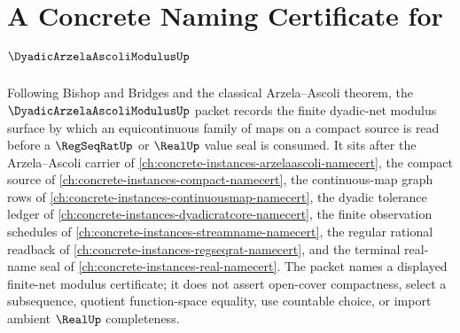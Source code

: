 \chapter{A Concrete Naming Certificate for $\DyadicArzelaAscoliModulusUp$}
\label{ch:concrete-instances-dyadic-arzela-ascoli-modulus-namecert}

Following Bishop and Bridges and the classical Arzela--Ascoli theorem, the $\DyadicArzelaAscoliModulusUp$ packet records the finite dyadic-net modulus surface by which an equicontinuous family of maps on a compact source is read before a $\RegSeqRatUp$ or $\RealUp$ value seal is consumed. It sits after the Arzela--Ascoli carrier of \autoref{ch:concrete-instances-arzelaascoli-namecert}, the compact source of \autoref{ch:concrete-instances-compact-namecert}, the continuous-map graph rows of \autoref{ch:concrete-instances-continuousmap-namecert}, the dyadic tolerance ledger of \autoref{ch:concrete-instances-dyadicratcore-namecert}, the finite observation schedules of \autoref{ch:concrete-instances-streamname-namecert}, the regular rational readback of \autoref{ch:concrete-instances-regseqrat-namecert}, and the terminal real-name seal of \autoref{ch:concrete-instances-real-namecert}. The packet names a displayed finite-net modulus certificate; it does not assert open-cover compactness, select a subsequence, quotient function-space equality, use countable choice, or import ambient $\RealUp$ completeness.

